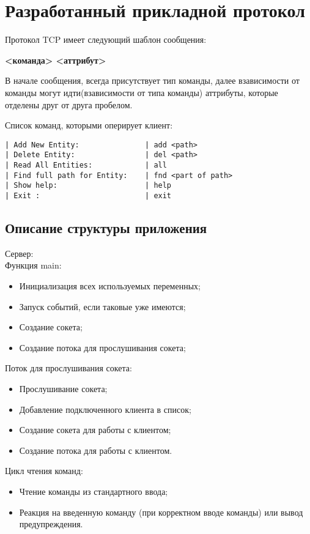 \documentclass[a4paper,14pt]{article}
\begin{document}
\section{Разработанный прикладной протокол}
Протокол TCP имеет следующий шаблон сообщения:
\begin{center}
	\textbf{<команда> <аттрибут> }
\end{center}
В начале сообщения, всегда присутствует тип команды, далее взависимости от команды могут идти(взависимости от типа команды) аттрибуты, которые отделены друг от друга пробелом.

Список команд, которыми оперирует клиент:
\begin{lstlisting}
| Add New Entity:               | add <path>
| Delete Entity:                | del <path>  
| Read All Entities:            | all                      
| Find full path for Entity:    | fnd <part of path>  
| Show help:                    | help 
| Exit :                        | exit 
\end{lstlisting}

\subsection{Описание структуры приложения}
Сервер:\\
Функция main:
	\begin{itemize}		
        \item Инициализация всех используемых переменных;
        \item Запуск событий, если таковые уже имеются;
        \item Создание сокета;
        \item Создание потока для прослушивания сокета;
	\end{itemize}
 Поток для прослушивания сокета:
    \begin{itemize}
        \item Прослушивание сокета;
        \item Добавление подключенного клиента в список;
        \item Создание сокета для работы с клиентом;
        \item Создание потока для работы с клиентом.
	\end{itemize}
Цикл чтения команд:
    \begin{itemize}
        \item Чтение команды из стандартного ввода;
        \item Реакция на введенную команду (при корректном вводе команды) или вывод предупреждения.
    \end{itemize}
\end{document}
